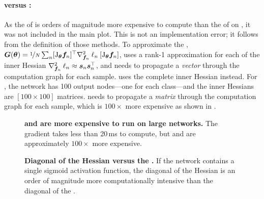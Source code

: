 \paragraph{\KFAC versus \KFLR:}
As the \KFLR of \citet{botev2017practical} is orders of magnitude more expensive
to compute than the \KFAC of \citet{martens2015optimizing} on , it
was not included in the main plot. This is not an implementation error; it
follows from the definition of those methods. To approximate the \GGN,
${\bm{G}}({\bm{\theta}}) = \nicefrac{1}{N} \sum_n [\mathrm{J}_{{\bm{\theta}}} {\bm{f}}_n]^\top
\nabla_{{\bm{f}}_n}^2 \: \ell_n \: [\mathrm{J}_{{\bm{\theta}}} {\bm{f}}_n]$, \KFAC uses a rank-1
approximation for each of the inner Hessian $\nabla_{{\bm{f}}_n}^2 \: \ell_n \approx
{\bm{s}}_n{\bm{s}}_n^\top$, and needs to propagate a \emph{vector} through the computation
graph for each sample. \KFLR uses the complete inner Hessian instead. For
, the network has 100 output nodes---one for each class---and the
inner Hessians are $[100 \times 100]$ matrices. \KFLR needs to propagate a
\emph{matrix} through the computation graph for each sample, which is
$100\times$ more expensive as shown in .

\begin{figure*}[!htbp]
  \centering
  
  \tikzexternalenable
  
  \tikzexternaldisable
  \vspace{-2ex}
  \caption{ \textbf{\KFLR and \DiagGGN are more expensive to run on large
      networks.} The gradient takes less than 20\,ms to compute, but \KFLR and
    \DiagGGN are approximately $100\times$ more expensive. }
  \label{backpack::fig:apx-bench}
\end{figure*}

\begin{figure}[!htbp]
  \vspace{0ex}
  \centering
  
  \tikzexternalenable
  
  \tikzexternaldisable
  \caption{ \textbf{Diagonal of the Hessian versus the \GGN.} If the network
    contains a single sigmoid activation function, the diagonal of the Hessian
    is an order of magnitude more computationally intensive than the diagonal of
    the \GGN. }
  \label{backpack::fig:apx-diagh}
\end{figure}

